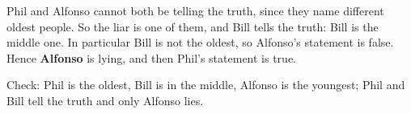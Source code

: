 Phil and Alfonso cannot both be telling the truth, since they name different oldest people. So the liar is one of them, and Bill tells the truth: Bill is the middle one. In particular Bill is not the oldest, so Alfonso's statement is false. Hence \textbf{Alfonso} is lying, and then Phil's statement is true.

Check: Phil is the oldest, Bill is in the middle, Alfonso is the youngest; Phil and Bill tell the truth and only Alfonso lies.
